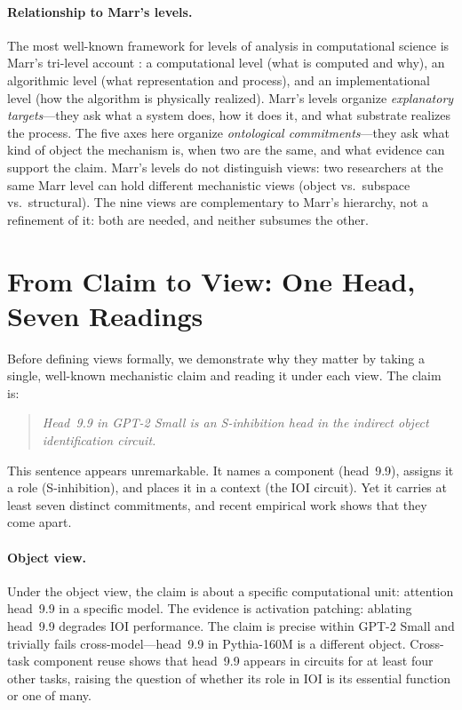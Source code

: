 \documentclass{article}
\begin{document}
\paragraph{Relationship to Marr's levels.}
The most well-known framework for levels of analysis in computational
science is Marr's tri-level account \citep{marr1982}: a computational
level (what is computed and why), an algorithmic level (what
representation and process), and an implementational level (how the
algorithm is physically realized).  Marr's levels organize
\emph{explanatory targets}---they ask what a system does, how it does
it, and what substrate realizes the process.  The five axes here
organize \emph{ontological commitments}---they ask what kind of object
the mechanism is, when two are the same, and what evidence can support
the claim.  Marr's levels do not distinguish views: two researchers
at the same Marr level can hold different mechanistic views (object vs.\
subspace vs.\ structural).  The nine views are complementary to Marr's
hierarchy, not a refinement of it: both are needed, and neither
subsumes the other.


\section{From Claim to View: One Head, Seven Readings}\label{sec:motivation}

Before defining views formally, we demonstrate why they matter by
taking a single, well-known mechanistic claim and reading it under
each view.  The claim is:

\begin{quote}
\emph{Head~9.9 in GPT-2 Small is an S-inhibition head in the
indirect object identification circuit.}
\end{quote}

This sentence appears unremarkable.  It names a component (head~9.9),
assigns it a role (S-inhibition), and places it in a context (the IOI
circuit).  Yet it carries at least seven distinct commitments, and recent
empirical work shows that they come apart.

\paragraph{Object view.}
Under the object view, the claim is about a specific computational unit:
attention head~9.9 in a specific model.  The evidence is activation
patching: ablating head~9.9 degrades IOI performance.  The claim is
precise within GPT-2 Small and trivially fails cross-model---head~9.9
in Pythia-160M is a different object.  Cross-task component reuse
\citep{merullo2024} shows that head~9.9 appears in circuits for at
least four other tasks, raising the question of whether its role in IOI
is its essential function or one of many.
\end{document}
